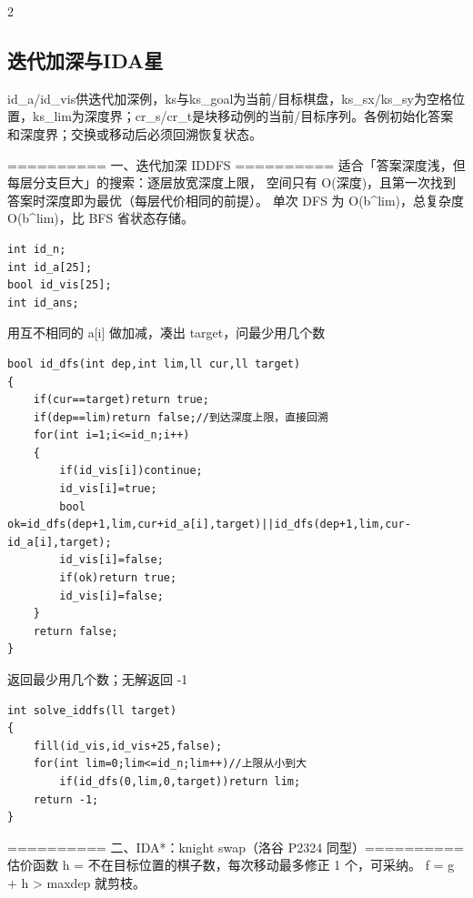 \documentclass[UTF8,fontset=fandol,a4paper,twoside]{ctexart}
\newcommand{\note}[1]{{\fontsize{10}{12}\selectfont #1\par}}
\begin{document}
\begin{multicols}{2}
\subsection{迭代加深与IDA星}

\note{id\_a/\allowbreak{}id\_vis供迭代加深例，ks与ks\_goal为当前/\allowbreak{}目标棋盘，ks\_sx/\allowbreak{}ks\_sy为空格位置，ks\_lim为深度界；cr\_s/\allowbreak{}cr\_t是块移动例的当前/\allowbreak{}目标序列。各例初始化答案和深度界；交换或移动后必须回溯恢复状态。}
\note{=\allowbreak{}=\allowbreak{}=\allowbreak{}=\allowbreak{}=\allowbreak{}=\allowbreak{}=\allowbreak{}=\allowbreak{}=\allowbreak{}=\allowbreak{} 一、迭代加深 IDDFS =\allowbreak{}=\allowbreak{}=\allowbreak{}=\allowbreak{}=\allowbreak{}=\allowbreak{}=\allowbreak{}=\allowbreak{}=\allowbreak{}=\allowbreak{} 适合「答案深度浅，但每层分支巨大」的搜索：逐层放宽深度上限， 空间只有 O(\allowbreak{}深度)\allowbreak{}，且第一次找到答案时深度即为最优（每层代价相同的前提）。 单次 DFS 为 O(\allowbreak{}b\textasciicircum{}lim)\allowbreak{}，总复杂度 O(\allowbreak{}b\textasciicircum{}lim)\allowbreak{}，比 BFS 省状态存储。}
\begin{lstlisting}
int id_n;
int id_a[25];
bool id_vis[25];
int id_ans;
\end{lstlisting}
\note{用互不相同的 a[\allowbreak{}i]\allowbreak{} 做加减，凑出 target，问最少用几个数}
\begin{lstlisting}
bool id_dfs(int dep,int lim,ll cur,ll target)
{
    if(cur==target)return true;
    if(dep==lim)return false;//到达深度上限，直接回溯
    for(int i=1;i<=id_n;i++)
    {
        if(id_vis[i])continue;
        id_vis[i]=true;
        bool ok=id_dfs(dep+1,lim,cur+id_a[i],target)||id_dfs(dep+1,lim,cur-id_a[i],target);
        id_vis[i]=false;
        if(ok)return true;
        id_vis[i]=false;
    }
    return false;
}
\end{lstlisting}
\note{返回最少用几个数；无解返回 -\allowbreak{}1}
\begin{lstlisting}
int solve_iddfs(ll target)
{
    fill(id_vis,id_vis+25,false);
    for(int lim=0;lim<=id_n;lim++)//上限从小到大
        if(id_dfs(0,lim,0,target))return lim;
    return -1;
}
\end{lstlisting}
\note{=\allowbreak{}=\allowbreak{}=\allowbreak{}=\allowbreak{}=\allowbreak{}=\allowbreak{}=\allowbreak{}=\allowbreak{}=\allowbreak{}=\allowbreak{} 二、IDA*：knight swap（洛谷 P2324 同型）=\allowbreak{}=\allowbreak{}=\allowbreak{}=\allowbreak{}=\allowbreak{}=\allowbreak{}=\allowbreak{}=\allowbreak{}=\allowbreak{}=\allowbreak{} 估价函数 h =\allowbreak{} 不在目标位置的棋子数，每次移动最多修正 1 个，可采纳。 f =\allowbreak{} g +\allowbreak{} h >\allowbreak{} maxdep 就剪枝。}

\end{multicols}
\end{document}
